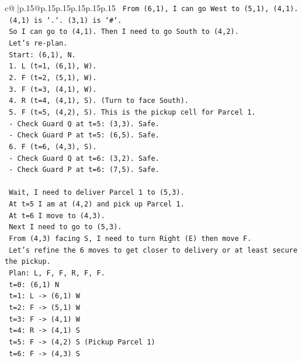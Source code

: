 \documentclass{article}
\begin{document}
{\begin{supertabular}{c@{$\;$}|p{.15\linewidth}@{}p{.15\linewidth}p{.15\linewidth}p{.15\linewidth}p{.15\linewidth}p{.15\linewidth}}
{{{\texttt{   From (6,1), I can go West to (5,1), (4,1).} \\
\texttt{   (4,1) is `.`. (3,1) is `\#`.} \\
\texttt{   So I can go to (4,1). Then I need to go South to (4,2).} \\
\texttt{   Let's re{-}plan.} \\
\texttt{   Start: (6,1), N.} \\
\texttt{   1. L (t=1, (6,1), W).} \\
\texttt{   2. F (t=2, (5,1), W).} \\
\texttt{   3. F (t=3, (4,1), W).} \\
\texttt{   4. R (t=4, (4,1), S). (Turn to face South).} \\
\texttt{   5. F (t=5, (4,2), S). This is the pickup cell for Parcel 1.} \\
\texttt{      {-} Check Guard Q at t=5: (3,3). Safe.} \\
\texttt{      {-} Check Guard P at t=5: (6,5). Safe.} \\
\texttt{   6. F (t=6, (4,3), S).} \\
\texttt{      {-} Check Guard Q at t=6: (3,2). Safe.} \\
\texttt{      {-} Check Guard P at t=6: (7,5). Safe.} \\
\\ 
\texttt{   Wait, I need to deliver Parcel 1 to (5,3).} \\
\texttt{   At t=5 I am at (4,2) and pick up Parcel 1.} \\
\texttt{   At t=6 I move to (4,3).} \\
\texttt{   Next I need to go to (5,3).} \\
\texttt{   From (4,3) facing S, I need to turn Right (E) then move F.} \\
\texttt{   Let's refine the 6 moves to get closer to delivery or at least secure the pickup.} \\
\texttt{   Plan: L, F, F, R, F, F.} \\
\texttt{   t=0: (6,1) N} \\
\texttt{   t=1: L {-}> (6,1) W} \\
\texttt{   t=2: F {-}> (5,1) W} \\
\texttt{   t=3: F {-}> (4,1) W} \\
\texttt{   t=4: R {-}> (4,1) S} \\
\texttt{   t=5: F {-}> (4,2) S (Pickup Parcel 1)} \\
\texttt{   t=6: F {-}> (4,3) S} \\
}}}
\end{supertabular}}
\end{document}
